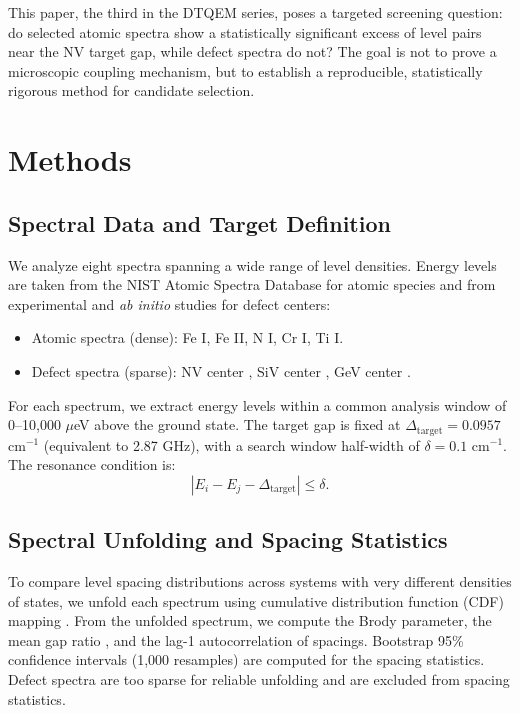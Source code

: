\documentclass[11pt,a4paper]{article}
\begin{document}
This paper, the third in the DTQEM series, poses a targeted screening question: do selected atomic spectra show a statistically significant excess of level pairs near the NV target gap, while defect spectra do not? The goal is not to prove a microscopic coupling mechanism, but to establish a reproducible, statistically rigorous method for candidate selection.

\FloatBarrier

\section{Methods}
\label{sec:methods}

\subsection{Spectral Data and Target Definition}
\label{sec:data}

We analyze eight spectra spanning a wide range of level densities. Energy levels are taken from the NIST Atomic Spectra Database \cite{NIST_ASD} for atomic species and from experimental and \textit{ab initio} studies for defect centers:

\begin{itemize}[noitemsep]
    \item Atomic spectra (dense): Fe I, Fe II, N I, Cr I, Ti I.
    \item Defect spectra (sparse): NV center \cite{Doherty2013}, SiV center \cite{SiV_spectrum}, GeV center \cite{GeV_spectrum}.
\end{itemize}

For each spectrum, we extract energy levels within a common analysis window of 0--10,000 $\mu$eV above the ground state. The target gap is fixed at $\Delta_{\mathrm{target}} = 0.0957$ cm$^{-1}$ (equivalent to 2.87 GHz), with a search window half-width of $\delta = 0.1$ cm$^{-1}$. The resonance condition is:
\begin{equation}
|E_i - E_j - \Delta_{\mathrm{target}}| \leq \delta.
\label{eq:resonance}
\end{equation}

\subsection{Spectral Unfolding and Spacing Statistics}
\label{sec:unfolding}

To compare level spacing distributions across systems with very different densities of states, we unfold each spectrum using cumulative distribution function (CDF) mapping \cite{Guhr1998,Brody1981}. From the unfolded spectrum, we compute the Brody parameter, the mean gap ratio \cite{Atas2013}, and the lag-1 autocorrelation of spacings. Bootstrap 95\% confidence intervals (1,000 resamples) are computed for the spacing statistics. Defect spectra are too sparse for reliable unfolding and are excluded from spacing statistics.
\end{document}
